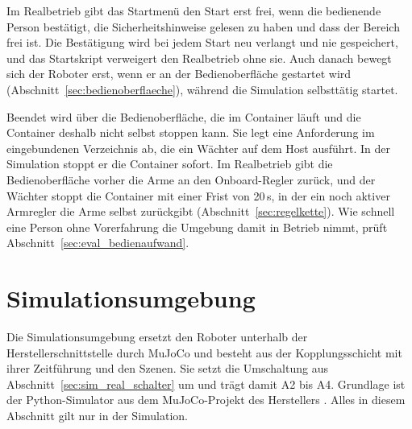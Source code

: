 Im Realbetrieb gibt das Startmenü den Start erst frei, wenn die bedienende Person bestätigt, die Sicherheitshinweise gelesen zu haben und dass der Bereich frei ist.
Die Bestätigung wird bei jedem Start neu verlangt und nie gespeichert, und das Startskript verweigert den Realbetrieb ohne sie.
Auch danach bewegt sich der Roboter erst, wenn er an der Bedienoberfläche gestartet wird (Abschnitt~\ref{sec:bedienoberflaeche}), während die Simulation selbsttätig startet.

Beendet wird über die Bedienoberfläche, die im Container läuft und die Container deshalb nicht selbst stoppen kann.
Sie legt eine Anforderung im eingebundenen Verzeichnis ab, die ein Wächter auf dem Host ausführt.
In der Simulation stoppt er die Container sofort.
Im Realbetrieb gibt die Bedienoberfläche vorher die Arme an den Onboard-Regler zurück, und der Wächter stoppt die Container mit einer Frist von 20\,s, in der ein noch aktiver Armregler die Arme selbst zurückgibt (Abschnitt~\ref{sec:regelkette}).
Wie schnell eine Person ohne Vorerfahrung die Umgebung damit in Betrieb nimmt, prüft Abschnitt~\ref{sec:eval_bedienaufwand}.

\section{Simulationsumgebung}
\label{sec:simulationsumgebung}
Die Simulationsumgebung ersetzt den Roboter unterhalb der Herstellerschnittstelle durch MuJoCo und besteht aus der Kopplungsschicht mit ihrer Zeitführung und den Szenen.
Sie setzt die Umschaltung aus Abschnitt~\ref{sec:sim_real_schalter} um und trägt damit A2 bis A4.
Grundlage ist der Python-Simulator aus dem MuJoCo-Projekt des Herstellers \cite{UnitreeMujoco}.
Alles in diesem Abschnitt gilt nur in der Simulation.

